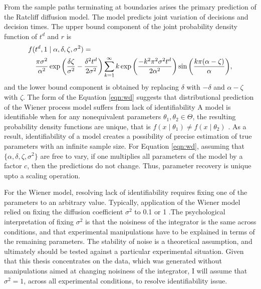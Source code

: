 \documentclass[12pt]{report}
\begin{document}
From the sample paths terminating at boundaries arises the primary prediction of the Ratcliff diffusion model. The model predicts joint variation of decisions and decision times. The upper bound component of the joint probability density function of $t^d$ and $r$ is
%
\begin{eqnarray} 
\label{eqn:wd}
\lefteqn{f(t^d, 1 \mid \alpha, \delta, \zeta, \sigma^2) =} \nonumber \\
& & \frac{\pi\sigma^2}{\alpha^2}\exp\left(\frac{\delta\zeta}{\sigma^2}-\frac{\delta^2t^d}{2\sigma^2}\right)
\sum_{k=1}^\infty{k\exp\left(\frac{-k^2\pi^2\sigma^2t^d}{2\alpha^2}\right)
\sin\left(\frac{k\pi(\alpha - \zeta)}{\alpha}\right)},
\end{eqnarray}
%
and the lower bound component is obtained by replacing $\delta$ with 
$-\delta$ and $\alpha - \zeta$ with $\zeta$.  The form of the Equation \ref{eqn:wd}
suggests that distributional prediction of the Wiener process model suffers from lack of identifiability %
A model is identifiable when for any nonequivalent parameters $\theta_1, \theta_2 \in \Theta$, the resulting probability density functions are unique, that is $f(x \mid \theta_1) \neq f(x \mid \theta_2)$ \citep{CasBer2002}. As a result, identifiability of a  model creates a possibility of precise estimation of true parameters with an infinite sample size. For Equation \ref{eqn:wd},
assuming that $\{\alpha,\delta,\zeta,\sigma^2\}$ are free to vary, if one multiplies all parameters of the model by a factor $c$, then the predictions do not change. Thus, parameter recovery is unique upto a scaling operation. 

For the Wiener model, resolving lack of identifiability requires fixing one of the parameters to an arbitrary value. Typically, application of the Wiener model relied on fixing the diffusion coefficient $\sigma^2$ to 0.1 or 1 \citep{Rat1978,RatTue2002,RatMck2008}.The psychological interpretation of fixing $\sigma^2$ is that the noisiness of the integrator is the same across conditions, and that experimental manipulations have to be explained in terms of the remaining parameters. The stability of noise is a theoretical assumption, and ultimately should be tested against a particular experimental situation. Given that this thesis concentrates on the \citet{RatRou1998} data, which was generated without manipulations aimed at changing noisiness of the integrator, I will assume that $\sigma^2 = 1$, across all experimental conditions, to resolve identifiability issue.
 
\end{document}
